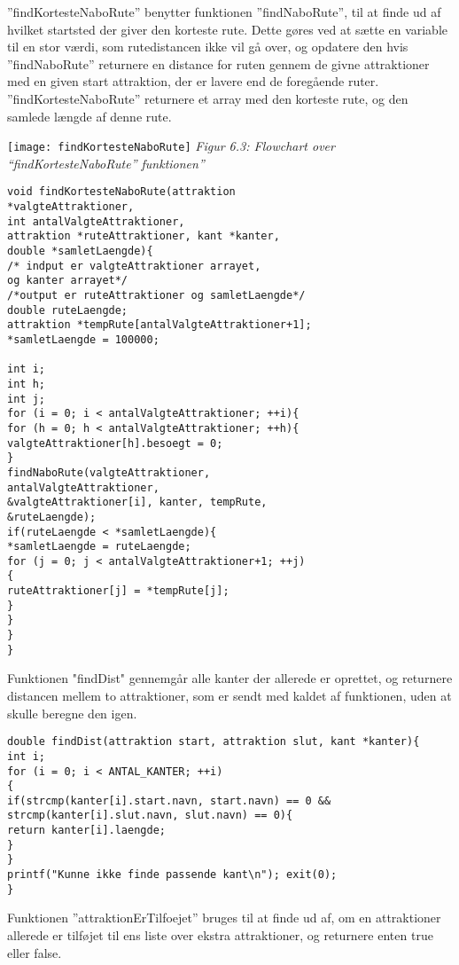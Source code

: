 ”findKortesteNaboRute” benytter funktionen ”findNaboRute”, til at finde ud af hvilket startsted der giver den korteste rute. Dette gøres ved at sætte en variable til en stor værdi, som rutedistancen ikke vil gå over, og opdatere den hvis ”findNaboRute” returnere en distance for ruten gennem de givne attraktioner med en given start attraktion, der er lavere end de foregående ruter. ”findKortesteNaboRute” returnere et array med den korteste rute, og den samlede længde af denne rute.  \newline
\begin{flushleft}
	\texttt{[image: findKortesteNaboRute]}\newline
	\textit{Figur 6.3: Flowchart over “findKortesteNaboRute” funktionen”}
\end{flushleft}
\begin{lstlisting}
void findKortesteNaboRute(attraktion
*valgteAttraktioner, 
int antalValgteAttraktioner, 
attraktion *ruteAttraktioner, kant *kanter, 
double *samletLaengde){
/* indput er valgteAttraktioner arrayet, 
og kanter arrayet*/
/*output er ruteAttraktioner og samletLaengde*/
double ruteLaengde;
attraktion *tempRute[antalValgteAttraktioner+1];
*samletLaengde = 100000;

int i;
int h;
int j;
for (i = 0; i < antalValgteAttraktioner; ++i){
for (h = 0; h < antalValgteAttraktioner; ++h){
valgteAttraktioner[h].besoegt = 0;
}
findNaboRute(valgteAttraktioner,
antalValgteAttraktioner, 
&valgteAttraktioner[i], kanter, tempRute,
&ruteLaengde);
if(ruteLaengde < *samletLaengde){
*samletLaengde = ruteLaengde;
for (j = 0; j < antalValgteAttraktioner+1; ++j)
{
ruteAttraktioner[j] = *tempRute[j];
}
}
}
}
\end{lstlisting}

Funktionen "findDist" gennemgår alle kanter der allerede er oprettet, og returnere distancen mellem to attraktioner, som er sendt med kaldet af funktionen, uden at skulle beregne den igen. \newline

\begin{lstlisting}
double findDist(attraktion start, attraktion slut, kant *kanter){
int i;
for (i = 0; i < ANTAL_KANTER; ++i)
{
if(strcmp(kanter[i].start.navn, start.navn) == 0 && strcmp(kanter[i].slut.navn, slut.navn) == 0){
return kanter[i].laengde;
}
}
printf("Kunne ikke finde passende kant\n"); exit(0);
}
\end{lstlisting}

Funktionen ”attraktionErTilfoejet” bruges til at finde ud af, om en attraktioner allerede er tilføjet til ens liste over ekstra attraktioner, og returnere enten true eller false. \newline

